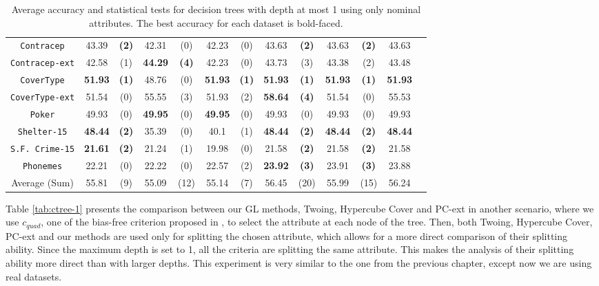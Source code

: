 \begin{table}
\begin{tabular}{c|cc|cc|cc|cc|cc|cc}
{\tt Contracep}     &  43.39       & {\bf (2)}    &  42.31       & (0)          &  42.23       & (0)              & 43.63      & {\bf (2)}     & 43.63      & {\bf (2)}  & 43.63       &           \\
{\tt Contracep-ext} &  42.58       & (1)          &  {\bf 44.29} & {\bf (4)}    &  42.23       & (0)              & 43.73      & (3)           & 43.38      & (2)        & 43.48       &           \\
{\tt CoverType}     &  {\bf 51.93} & {\bf (1)}    &  48.76       & (0)          & {\bf 51.93}  & {\bf (1)}        &{\bf 51.93} & {\bf (1)}     & {\bf 51.93}& {\bf (1)}  & {\bf 51.93} &           \\
{\tt CoverType-ext} &  51.54       & (0)          &  55.55       & (3)          &  51.93       & (2)              &{\bf 58.64} & {\bf (4)}     & 51.54      & (0)        & 55.53       &           \\
{\tt Poker}         &  49.93       & (0)          &  {\bf 49.95} & (0)          & {\bf 49.95}  & (0)              & 49.93      & (0)           & 49.93      & (0)        & 49.93       &           \\
{\tt Shelter-15}    &  {\bf 48.44} & {\bf (2)}    &  35.39       & (0)          &  40.1        & (1)              &{\bf 48.44} & {\bf (2)}     & {\bf 48.44}& {\bf (2)}  & {\bf 48.44} &           \\
{\tt S.F. Crime-15} &  {\bf 21.61} & {\bf (2)}    &  21.24       & (1)          & 19.98        & (0)              & 21.58      & {\bf (2)}     & 21.58      & {\bf (2)}  & 21.58       &           \\
{\tt Phonemes}      &  22.21       & (0)          &  22.22       & (0)          & 22.57        & (2)              &{\bf 23.92} & {\bf (3)}     & 23.91      & {\bf (3)}  & 23.88       &           \\
\hline
Average (Sum)       &  55.81       & (9)          &  55.09       & (12)         & 55.14        & (7)              &  56.45     & (20)          & 55.99      & (15)       & 56.24       &
\end{tabular}
\normalsize
\caption{Average accuracy and statistical tests  for  decision trees with depth at most 1 using only nominal attributes. The best accuracy for each dataset is bold-faced.}
\label{tab:nominal-1}
\end{table}

Table \ref{tab:ctree-1} presents the 
comparison between our GL methods, Twoing, Hypercube Cover and PC-ext in another scenario,
where we use $c_{quad}$, one of the bias-free criterion proposed in \cite{Hothorn:2006:URP}, to select the attribute at each node of the tree. 
Then, both Twoing, Hypercube Cover, PC-ext and our methods are  used only for splitting the chosen attribute, which allows for a  more direct comparison of their splitting ability. Since the maximum depth is set to 1, all the criteria are splitting the same attribute. This makes the analysis of their splitting ability more direct than with larger depths. This experiment is very similar to the one from the previous chapter, except now we are using real datasets.

